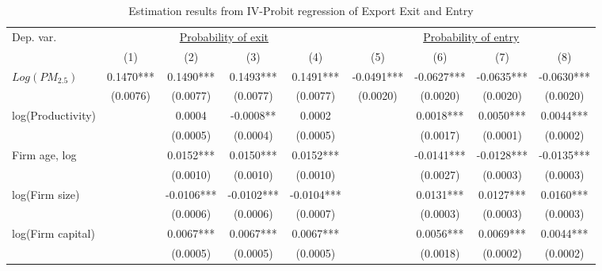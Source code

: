 \documentclass[12pt]{article}
\begin{document}
  \begin{table}[H]\centering
    \caption{Estimation results from IV-Probit regression of Export Exit and Entry} \label{tab:entry_exit}
    \resizebox{\textwidth}{!}
    {
    \begin{tabular}{l*{8}{c}}
      \hline\hline
      Dep. var.  &\multicolumn{4}{c}{\underline{Probability of exit}}&\multicolumn{4}{c}{\underline{Probability of entry}}\\
                          &\multicolumn{1}{c}{(1)}&\multicolumn{1}{c}{(2)}&\multicolumn{1}{c}{(3)}&\multicolumn{1}{c}{(4)}&\multicolumn{1}{c}{(5)}&\multicolumn{1}{c}{(6)}&\multicolumn{1}{c}{(7)}&\multicolumn{1}{c}{(8)}\\
     \hline                    
      $Log(PM_{2.5})$           &0.1470***	 &0.1490***	&0.1493***&0.1491***&-0.0491***	&-0.0627***&-0.0635***& -0.0630*** \\
                             &(0.0076)	 &(0.0077) &(0.0077)&(0.0077)&(0.0020)	&(0.0020)&(0.0020)&(0.0020) \\
      
      log(Productivity)         &&0.0004	&-0.0008**&0.0002&&0.0018***&0.0050***& 0.0044***\\
                                  &&(0.0005)&(0.0004)&	(0.0005) &&(0.0017)&(0.0001)&(0.0002)\\
      
     Firm age, log	         &&  	0.0152***	&0.0150***&0.0152***&&  	-0.0141***&-0.0128***&-0.0135***\\
                       &&(0.0010)	&(0.0010)&(0.0010)&&	(0.0027)&(0.0003)&(0.0003)\\
     log(Firm size)	    &&	-0.0106***	&-0.0102***&-0.0104***&&  	0.0131***&0.0127***& 0.0160***\\
                      && (0.0006)	&(0.0006)&(0.0007)&&	(0.0003) &(0.0003)&(0.0003)\\
     log(Firm capital)	  &&	 0.0067***	&0.0067***&0.0067***&&  	0.0056***&0.0069***& 0.0044***\\
                        && (0.0005)	&(0.0005)&(0.0005)&&	(0.0018) &(0.0002)&(0.0002)\\
                                

\end{tabular}}
\end{table}
\end{document}
